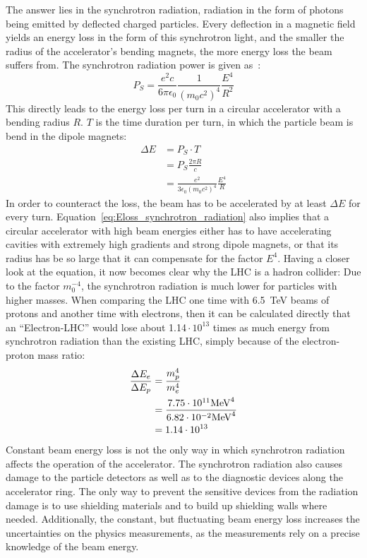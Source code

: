 The answer lies in the synchrotron radiation, radiation in the form of photons being emitted by deflected charged particles.
Every deflection in a magnetic field yields an energy loss in the form of this synchrotron light, and the smaller the radius of the accelerator's bending magnets, the more energy loss the beam suffers from.
The synchrotron radiation power is given as~\cite[p. 33]{Wille}:
\begin{equation}
 P_S = \frac{e^2c}{6\pi\epsilon_0}\frac{1}{(m_0c^2)^4}\frac{E^4}{R^2}
\end{equation}
This directly leads to the energy loss per turn in a circular accelerator with a bending radius $R$.
$T$ is the time duration per turn, in which the particle beam is bend in the dipole magnets:
\begin{align}
 \Delta E &= P_S\cdot T\\
 &= P_S\frac{2\pi R}{c}\\
 &=\frac{e^2}{3\epsilon_0(m_0c^2)^4}\frac{E^4}{R} \label{eq:Eloss_synchrotron_radiation}
\end{align}
In order to counteract the loss, the beam has to be accelerated by at least $\Delta E$ for every turn.
Equation~\ref{eq:Eloss_synchrotron_radiation} also implies that a circular accelerator with high beam energies either has to have accelerating cavities with extremely high gradients and strong dipole magnets, or that its radius has be so large that it can compensate for the factor $E^4$.
Having a closer look at the equation, it now becomes clear why the LHC is a hadron collider:
Due to the factor $m_0^{-4}$, the synchrotron radiation is much lower for particles with higher masses.
When comparing the LHC one time with \SI{6.5}{\TeV} beams of protons and another time with electrons, then it can be calculated directly that an ``Electron-LHC'' would lose about 1.14\,$\cdot\,10^{13}$ times as much energy from synchrotron radiation than the existing LHC, simply because of the electron-proton mass ratio:
\begin{align*}
 \frac{\Delta E_e}{\Delta E_p} &=\frac{m_p^4}{m_e^4}\\
 &= \frac{7.75\cdot10^{11} \textnormal{MeV}^4}{6.82\cdot10^{-2} \textnormal{MeV}^4}\\
 &=1.14\cdot10^{13}
\end{align*}
Constant beam energy loss is not the only way in which synchrotron radiation affects the operation of the accelerator.
The synchrotron radiation also causes damage to the particle detectors as well as to the diagnostic devices along the accelerator ring.
The only way to prevent the sensitive devices from the radiation damage is to use shielding materials and to build up shielding walls where needed.
Additionally, the constant, but fluctuating beam energy loss increases the uncertainties on the physics measurements, as the measurements rely on a precise knowledge of the beam energy.

